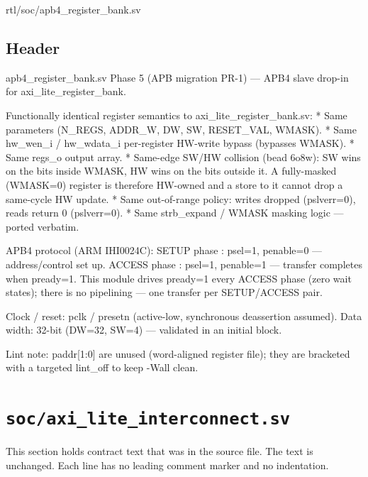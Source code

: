 \begin{relocated}{rtl/soc/apb4_register_bank.sv}

\subsection*{Header}

\begin{textblock}
apb4_register_bank.sv
Phase 5 (APB migration PR-1) — APB4 slave drop-in for axi_lite_register_bank.

Functionally identical register semantics to axi_lite_register_bank.sv:
  * Same parameters (N_REGS, ADDR_W, DW, SW, RESET_VAL, WMASK).
  * Same hw_wen_i / hw_wdata_i per-register HW-write bypass (bypasses WMASK).
  * Same regs_o output array.
  * Same-edge SW/HW collision (bead 6o8w): SW wins on the bits inside WMASK, HW wins
    on the bits outside it.  A fully-masked (WMASK=0) register is therefore HW-owned
    and a store to it cannot drop a same-cycle HW update.
  * Same out-of-range policy: writes dropped (pslverr=0), reads return 0 (pslverr=0).
  * Same strb_expand / WMASK masking logic — ported verbatim.

APB4 protocol (ARM IHI0024C):
  SETUP phase  : psel=1, penable=0 — address/control set up.
  ACCESS phase : psel=1, penable=1 — transfer completes when pready=1.
  This module drives pready=1 every ACCESS phase (zero wait states); there is
  no pipelining — one transfer per SETUP/ACCESS pair.

Clock / reset: pclk / presetn (active-low, synchronous deassertion assumed).
Data width: 32-bit (DW=32, SW=4) — validated in an initial block.

Lint note: paddr[1:0] are unused (word-aligned register file); they are
bracketed with a targeted lint_off to keep -Wall clean.
\end{textblock}

\end{relocated}

\section{\texttt{soc/axi\_lite\_interconnect.sv}}\label{ds:mod:axi-lite-interconnect}

This section holds contract text that was in the source file. The text is unchanged. Each line has no leading comment marker and no indentation.

